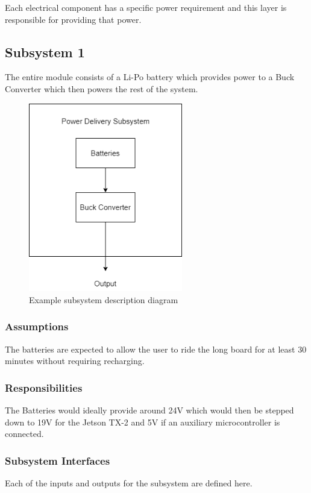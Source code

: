 Each electrical component has a specific power requirement and this layer is responsible for providing that power.

\subsection{Subsystem 1}
The entire module consists of a Li-Po battery which provides power to a Buck Converter which then powers the rest of the system.

\begin{figure}[h!]
	\centering
 	\includegraphics[width=0.60\textwidth]{images/Power Delivery Subsystem.png}
 \caption{Example subsystem description diagram}
\end{figure}

\subsubsection{Assumptions}
The batteries are expected to allow the user to ride the long board for at least 30 minutes without requiring recharging.

\subsubsection{Responsibilities}
The Batteries would ideally provide around 24V which would then be stepped down to 19V for the Jetson TX-2 and 5V if an auxiliary microcontroller is connected.

\subsubsection{Subsystem Interfaces}
Each of the inputs and outputs for the subsystem are defined here.

